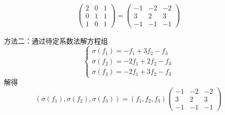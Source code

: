 \documentclass[12pt,fontset=fandol]{ctexart}
\begin{document}
\begin{solve}
\begin{enumerate}
\begin{align*}
                          \begin{pmatrix}
                              2 & 0 & 1 \\
                              0 & 1 & 1 \\
                              1 & 0 & 1
                          \end{pmatrix}
                          = \begin{pmatrix}
                                -1 & -2 & -2 \\
                                3  & 2  & 3  \\
                                -1 & -1 & -1
                            \end{pmatrix}
                      \end{align*}

                      方法二：通过待定系数法解方程组
                      \[ \begin{cases}
                              \sigma(f_1) = -f_1 + 3 f_2 - f_3   \\
                              \sigma(f_2) = -2 f_1 + 2 f_2 - f_3 \\
                              \sigma(f_3) = -2 f_1 + 3 f_2 - f_3
                          \end{cases} \]
                      解得
                      \[ (\sigma(f_1), \sigma(f_2), \sigma(f_3)) = (f_1, f_2, f_3) \begin{pmatrix}
                              -1 & -2 & -2 \\
                              3  & 2  & 3  \\
                              -1 & -1 & -1
                          \end{pmatrix} \]


\end{enumerate}
\end{solve}
\end{document}

